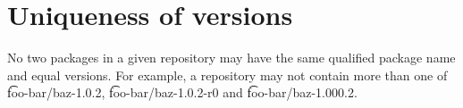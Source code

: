 \section{Uniqueness of versions}

No two packages in a given repository may have the same qualified package name and equal versions.
For example, a repository may not contain more than one of \t{foo-bar/baz-1.0.2},
\t{foo-bar/baz-1.0.2-r0} and \t{foo-bar/baz-1.000.2}.


